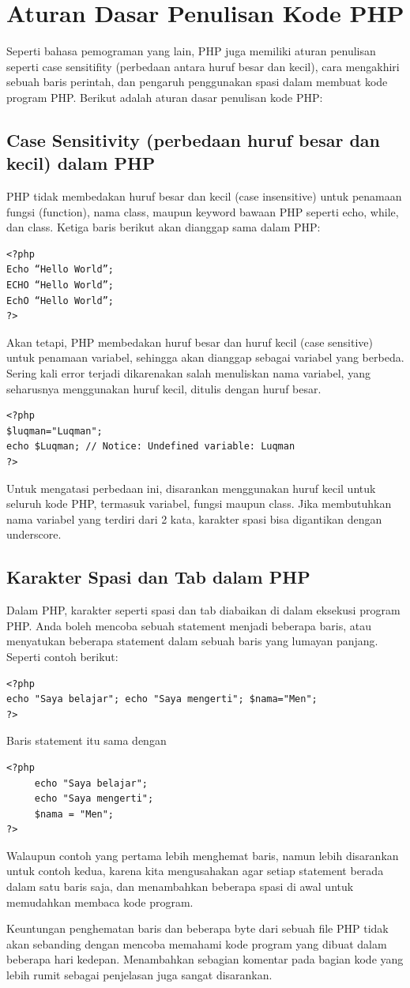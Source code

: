 \section{Aturan Dasar Penulisan Kode PHP}
Seperti bahasa pemograman yang lain, PHP juga memiliki aturan penulisan seperti case sensitifity (perbedaan antara huruf besar dan kecil), cara mengakhiri sebuah baris perintah, dan pengaruh penggunakan spasi dalam membuat kode program PHP. Berikut adalah aturan dasar penulisan kode PHP:
\subsection{Case Sensitivity (perbedaan huruf besar dan kecil) dalam PHP}
PHP tidak membedakan huruf besar dan kecil (case insensitive) untuk penamaan fungsi (function), nama class, maupun keyword bawaan PHP seperti echo, while, dan class. Ketiga baris berikut akan dianggap sama dalam PHP:
\begin{lstlisting}
<?php
Echo “Hello World”;
ECHO “Hello World”;
EchO “Hello World”;
?>
\end{lstlisting}
Akan tetapi, PHP membedakan huruf besar dan huruf kecil (case sensitive) untuk penamaan variabel, sehingga akan dianggap sebagai variabel yang berbeda. Sering kali error terjadi dikarenakan salah menuliskan nama variabel, yang seharusnya menggunakan huruf kecil, ditulis dengan huruf besar.
\begin{lstlisting}
<?php
$luqman="Luqman";
echo $Luqman; // Notice: Undefined variable: Luqman
?>
\end{lstlisting}
Untuk mengatasi perbedaan ini, disarankan menggunakan huruf kecil untuk seluruh kode PHP, termasuk variabel, fungsi maupun class. Jika membutuhkan nama variabel yang terdiri dari 2 kata, karakter spasi bisa digantikan dengan underscore.
\subsection{Karakter Spasi dan Tab dalam PHP}
Dalam PHP, karakter seperti spasi dan tab diabaikan di dalam eksekusi program PHP. Anda boleh mencoba sebuah statement menjadi beberapa baris, atau menyatukan beberapa statement dalam sebuah baris yang lumayan panjang. Seperti contoh berikut:
\begin{lstlisting}
<?php
echo "Saya belajar"; echo "Saya mengerti"; $nama="Men";
?>
\end{lstlisting}
Baris statement itu sama dengan
 \begin{lstlisting}
<?php
     echo "Saya belajar";
     echo "Saya mengerti";
     $nama = "Men";
?>
\end{lstlisting}
Walaupun contoh yang pertama lebih menghemat baris, namun lebih disarankan untuk contoh kedua, karena kita mengusahakan agar setiap statement berada dalam satu baris saja, dan menambahkan beberapa spasi di awal untuk memudahkan membaca kode program.
\par
Keuntungan penghematan baris dan beberapa byte dari sebuah file PHP tidak akan sebanding dengan mencoba memahami kode program yang dibuat dalam beberapa hari kedepan. Menambahkan sebagian komentar pada bagian kode yang lebih rumit sebagai penjelasan juga sangat disarankan.
